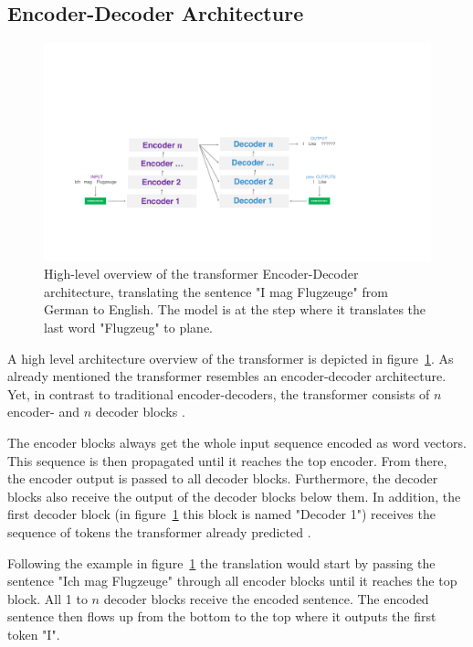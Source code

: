 \subsection{Encoder-Decoder Architecture}

\begin{figure}[htp]
	\centering
	\includegraphics[width=\textwidth]{figures/03_theory/03_transformer_Architecture_HighLevel}
	\caption{High-level overview of the transformer Encoder-Decoder architecture, translating the sentence "I mag Flugzeuge" from German to English. The model is at the step where it translates the last word "Flugzeug" to plane.}
	\label{fig:03_transformer_HighlevelOverview}
\end{figure}

A high level architecture overview of the transformer is depicted in figure~\ref{fig:03_transformer_HighlevelOverview}. As already mentioned the transformer resembles an encoder-decoder architecture. Yet, in contrast to traditional encoder-decoders, the transformer consists of $n$ encoder- and $n$ decoder blocks \cite{Vaswani2017d}. 
\medskip

The encoder blocks always get the whole input sequence encoded as word vectors. This sequence is then propagated until it reaches the top encoder. From there, the encoder output is passed to all decoder blocks. Furthermore, the decoder blocks also receive the output of the decoder blocks below them. In addition, the first decoder block {(in figure~\ref{fig:03_transformer_HighlevelOverview} this block is named "Decoder 1")} receives the sequence of tokens the transformer already predicted \cite{Vaswani2017d}. 
\medskip

Following the example in figure~\ref{fig:03_transformer_HighlevelOverview} the translation would start by passing the sentence "Ich mag Flugzeuge" through all encoder blocks until it reaches the top block. All 1 to $n$ decoder blocks receive the encoded sentence. The encoded sentence then flows up from the bottom to the top where it outputs the first token "I". 

